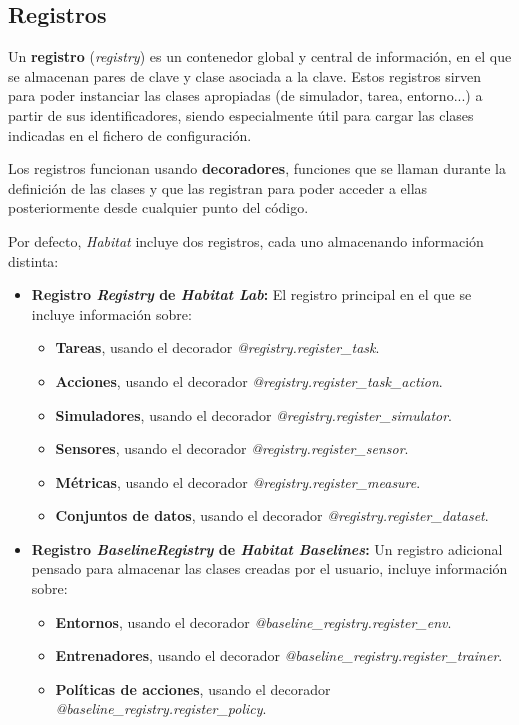 \subsection{Registros}

Un \textbf{registro} (\textit{registry}) es un contenedor global y central de información, en el que se almacenan pares de clave y clase asociada a la clave. Estos registros sirven para poder instanciar las clases apropiadas (de simulador, tarea, entorno...) a partir de sus identificadores, siendo especialmente útil para cargar las clases indicadas en el fichero de configuración.

Los registros funcionan usando \textbf{decoradores}, funciones que se llaman durante la definición de las clases y que las registran para poder acceder a ellas posteriormente desde cualquier punto del código.

Por defecto, \textit{Habitat} incluye dos registros, cada uno almacenando información distinta:

\begin{itemize}
	\item \textbf{Registro \textit{Registry} de \textit{Habitat Lab}:} El registro principal en el que se incluye información sobre:
	\begin{itemize}
		\item \textbf{Tareas}, usando el decorador \textit{@registry.register{\_}task}.
		\item \textbf{Acciones}, usando el decorador \textit{@registry.register{\_}task{\_}action}.
		\item \textbf{Simuladores}, usando el decorador \textit{@registry.register{\_}simulator}.
		\item \textbf{Sensores}, usando el decorador \textit{@registry.register{\_}sensor}.
		\item \textbf{Métricas}, usando el decorador \textit{@registry.register{\_}measure}.
		\item \textbf{Conjuntos de datos}, usando el decorador \textit{@registry.register{\_}dataset}.
	\end{itemize}
	\item \textbf{Registro \textit{BaselineRegistry} de \textit{Habitat Baselines}:} Un registro adicional pensado para almacenar las clases creadas por el usuario, incluye información sobre:
	\begin{itemize}
		\item \textbf{Entornos}, usando el decorador \textit{@baseline{\_}registry.register{\_}env}.
				\item \textbf{Entrenadores}, usando el decorador \textit{@baseline{\_}registry.register{\_}trainer}.
				\item \textbf{Políticas de acciones}, usando el decorador \textit{@baseline{\_}registry.register{\_}policy}.
	\end{itemize}
\end{itemize}

